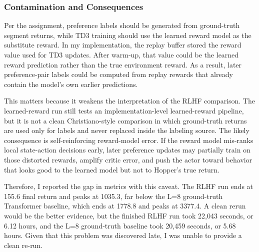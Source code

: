 \documentclass[11pt]{article}
\begin{document}
\begin{table}[!htbp]
\centering
\small
\caption{Learned-reward RLHF run compared against ground-truth-reward Transformer runs.}
\label{tab:rlhf-comparison}
\end{table}

\subsubsection{Contamination and Consequences}
Per the assignment, preference labels should be generated from ground-truth segment returns, while TD3 training should use the learned reward model as the substitute reward. In my implementation, the replay buffer stored the reward value used for TD3 updates. After warm-up, that value could be the learned reward prediction rather than the true environment reward. As a result, later preference-pair labels could be computed from replay rewards that already contain the model's own earlier predictions.

This matters because it weakens the interpretation of the RLHF comparison. The learned-reward run still tests an implementation-level learned-reward pipeline, but it is not a clean Christiano-style comparison in which ground-truth returns are used only for labels and never replaced inside the labeling source. The likely consequence is self-reinforcing reward-model error. If the reward model mis-ranks local state-action decisions early, later preference updates may partially train on those distorted rewards, amplify critic error, and push the actor toward behavior that looks good to the learned model but not to Hopper's true return.

Therefore, I reported the gap in metrics with this caveat. The RLHF run ends at 155.6 final return and peaks at 1035.3, far below the L=8 ground-truth Transformer baseline, which ends at 1778.8 and peaks at 3377.4. A clean rerun would be the better evidence, but the finished RLHF run took 22,043 seconds, or 6.12 hours, and the L=8 ground-truth baseline took 20,459 seconds, or 5.68 hours. Given that this problem was discovered late, I was unable to provide a clean re-run.
\end{document}
